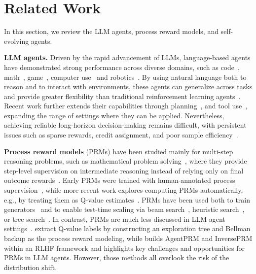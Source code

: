 \documentclass{article}
\theoremstyle{plain}
\theoremstyle{definition}
\theoremstyle{remark}
\begin{document}



\section{Related Work}

In this section, we review the LLM agents, process reward models, and self-evolving agents.

\textbf{LLM agents.} 
Driven by the rapid advancement of LLMs, language-based agents have demonstrated strong performance across diverse domains, such as code~\citep{roziere2023code}, math~\citep{luo2023wizardmath,yuan2023scaling}, game~\citep{wangvoyager,liuagentbench,Fang_Deng_Zhang_Shi_Chen_Pechenizkiy_Wang_2024,zhang2025ruag}, computer use~\citep{hong2024cogagent, liu2026infiguiagent, wang2025large} and robotics~\citep{wang2025large}.
By using natural language both to reason and to interact with environments, these agents can generalize across tasks and provide greater flexibility than traditional reinforcement learning agents~\cite{yao2022react,shinn2023reflexion}.
Recent work further extends their capabilities through planning~\citep{song2023llm,zhao2023large,chenscaling}, and tool use~\citep{yuan-etal-2025-easytool,lu-etal-2025-toolsandbox}, expanding the range of settings where they can be applied.
Nevertheless, achieving reliable long-horizon decision-making remains difficult, with persistent issues such as sparse rewards, credit assignment, and poor sample efficiency~\cite{rudder, randomized_return_decomposition, grd,gigpo}.

\textbf{Process reward models} (PRMs) have been studied mainly for multi-step reasoning problems, such as mathematical problem solving~\citep{cobbe2021training}, where they provide step-level supervision on intermediate reasoning instead of relying only on final outcome rewards~\citep{lightman2023let,uesato2022solving}. Early PRMs were trained with human-annotated process supervision~\citep{uesato2022solving}, while more recent work explores computing PRMs automatically, e.g., by treating them as Q-value estimates~\citep{wang2024math,luo2024improve}. PRMs have been used both to train generators~\citep{shao2024deepseekmath} and to enable test-time scaling via beam search~\citep{snell2024scaling}, heuristic search~\citep{ma2023let}, or tree search~\citep{wu2024inference}.
In contrast, PRMs are much less discussed in LLM agent settings~\citep{lin2025qlass,choudhury2025process}. \citet{lin2025qlass} extract Q-value labels by constructing an exploration tree and Bellman backup as the process reward modeling, while \citet{choudhury2025process} builds AgentPRM and InversePRM within an RLHF framework and highlights key challenges and opportunities for PRMs in LLM agents. However, those methods all overlook the risk of the distribution shift.
\end{document}
